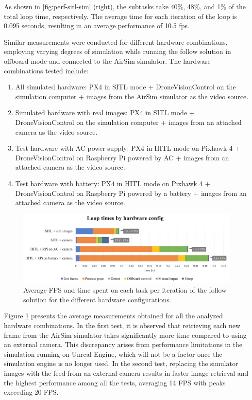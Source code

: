 As shown in \ref{fig:perf-sitl-sim} (right), the subtasks take 40\%, 48\%, and 1\% of the total loop time, respectively. The average time for each iteration of the loop is 0.095 seconds, resulting in an average performance of 10.5 \acrfull{fps}.

Similar measurements were conducted for different hardware combinations, employing varying degrees of simulation while running the follow solution in offboard mode and connected to the AirSim simulator. The hardware combinations tested include:
\begin{enumerate}
    \item All simulated hardware: PX4 in SITL mode + DroneVisionControl on the simulation computer + images from the AirSim simulator as the video source.
    \item Simulated hardware with real images: PX4 in SITL mode + DroneVisionControl on the simulation computer + images from an attached camera as the video source.
    \item Test hardware with AC power supply: PX4 in HITL mode on Pixhawk 4 + DroneVisionControl on Raspberry Pi powered by AC + images from an attached camera as the video source.
    \item Test hardware with battery: PX4 in HITL mode on Pixhawk 4 + DroneVisionControl on Raspberry Pi powered by a battery + images from an attached camera as the video source.
\end{enumerate}


\begin{figure}
  \centering
  \includegraphics[width=\textwidth, keepaspectratio]{img/performance-graph.png}
  \caption{Average FPS and time spent on each task per iteration of the follow solution for the different hardware configurations.}
  \label{fig:perf-analysis}
\end{figure}


Figure \ref{fig:perf-analysis} presents the average measurements obtained for all the analyzed hardware combinations. In the first test, it is observed that retrieving each new frame from the AirSim simulator takes significantly more time compared to using an external camera. This discrepancy arises from performance limitations in the simulation running on Unreal Engine, which will not be a factor once the simulation engine is no longer used. In the second test, replacing the simulator images with the feed from an external camera results in faster image retrieval and the highest performance among all the tests, averaging 14 FPS with peaks exceeding 20 FPS.

